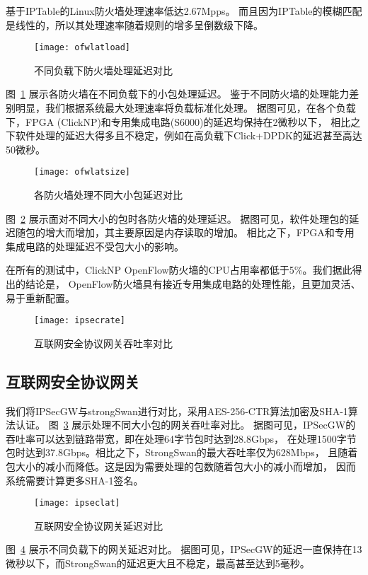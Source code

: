 基于IPTable的Linux防火墙处理速率低达2.67Mpps。
而且因为IPTable的模糊匹配是线性的，所以其处理速率随着规则的增多呈倒数级下降。

\begin{figure}[htbp]
\centering
\texttt{[image: ofwlatload]}
\caption{不同负载下防火墙处理延迟对比} \label{fig:ofwlatload}
\end{figure}
图~\ref{fig:ofwlatload} 展示各防火墙在不同负载下的小包处理延迟。
鉴于不同防火墙的处理能力差别明显，我们根据系统最大处理速率将负载标准化处理。
据图可见，在各个负载下，FPGA (ClickNP)和专用集成电路(S6000)的延迟均保持在2微秒以下，
相比之下软件处理的延迟大得多且不稳定，例如在高负载下Click+DPDK的延迟甚至高达50微秒。

\begin{figure}[htbp]
\centering
\texttt{[image: ofwlatsize]}
\caption{各防火墙处理不同大小包延迟对比} \label{fig:ofwlatsize}
\end{figure}
图~\ref{fig:ofwlatsize} 展示面对不同大小的包时各防火墙的处理延迟。
据图可见，软件处理包的延迟随包的增大而增加，其主要原因是内存读取的增加。
相比之下，FPGA和专用集成电路的处理延迟不受包大小的影响。

在所有的测试中，ClickNP OpenFlow防火墙的CPU占用率都低于5\%。我们据此得出的结论是，
OpenFlow防火墙具有接近专用集成电路的处理性能，且更加灵活、易于重新配置。

\begin{figure}[htbp]
\centering
\texttt{[image: ipsecrate]}
\caption{互联网安全协议网关吞吐率对比} \label{fig:ipsecrate}
\end{figure}

\subsection{互联网安全协议网关}
我们将IPSecGW与strongSwan进行对比，采用AES-256-CTR算法加密及SHA-1算法认证。
图~\ref{fig:ipsecrate} 展示处理不同大小包的网关吞吐率对比。
据图可见，IPSecGW的吞吐率可以达到链路带宽，即在处理64字节包时达到28.8Gbps，
在处理1500字节包时达到37.8Gbps。相比之下，StrongSwan的最大吞吐率仅为628Mbps，
且随着包大小的减小而降低。这是因为需要处理的包数随着包大小的减小而增加，
因而系统需要计算更多SHA-1签名。

\begin{figure}[htbp]
\centering
\texttt{[image: ipseclat]}
\caption{互联网安全协议网关延迟对比} \label{fig:ipseclat}
\end{figure}
图~\ref{fig:ipseclat} 展示不同负载下的网关延迟对比。
据图可见，IPSecGW的延迟一直保持在13微秒以下，而StrongSwan的延迟更大且不稳定，最高甚至达到5毫秒。

